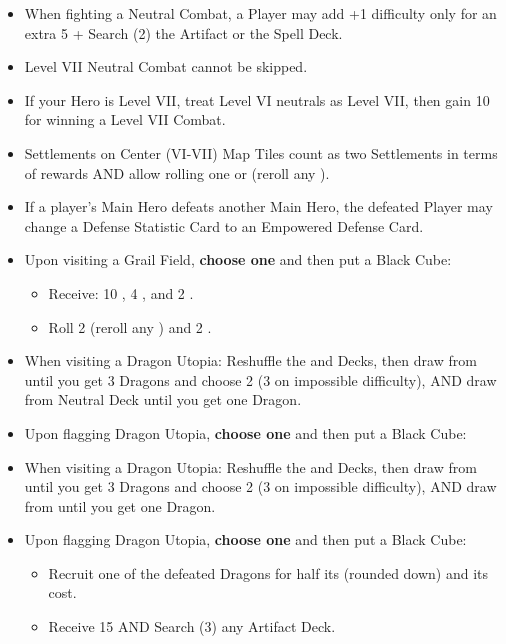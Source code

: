 \begin{multicols*}{2}
\begin{itemize}
  \item When fighting a Neutral Combat, a Player may add +1 difficulty only for an extra 5  + Search (2) the Artifact or the Spell Deck. %
  \item Level VII Neutral Combat cannot be skipped.
  \item If your Hero is Level VII, treat Level VI neutrals as Level VII, then gain 10  for winning a Level VII Combat. %
  \item Settlements on Center (VI-VII) Map Tiles count as two Settlements in terms of rewards AND allow rolling one  or  (reroll any ).
  \item If a player's Main Hero defeats another Main Hero, the defeated Player may change a Defense Statistic Card to an Empowered Defense Card. %
  \item Upon visiting a Grail Field, \textbf{choose one} and then put a Black Cube:
  \begin{itemize}
    \item Receive: 10 , 4 , and 2 .
    \item Roll 2  (reroll any ) and 2 .
  \end{itemize}
  \item When visiting a Dragon Utopia: Reshuffle the  and  Decks, then draw from  until you get 3 Dragons and choose 2 (3 on impossible difficulty), AND draw from  Neutral Deck until you get one Dragon.
  \item Upon flagging Dragon Utopia, \textbf{choose one} and then put a Black Cube: 
  \item When visiting a Dragon Utopia: Reshuffle the  and  Decks, then draw from  until you get 3 Dragons and choose 2 (3 on impossible difficulty), AND draw from  until you get one Dragon.
  \item Upon flagging Dragon Utopia, \textbf{choose one} and then put a Black Cube:

  \begin{itemize}
    \item Recruit one of the defeated Dragons for half its  (rounded down) and its  cost.
    \item Receive 15  AND Search (3) any Artifact Deck.
  \end{itemize}
\end{itemize}


\end{multicols*}
